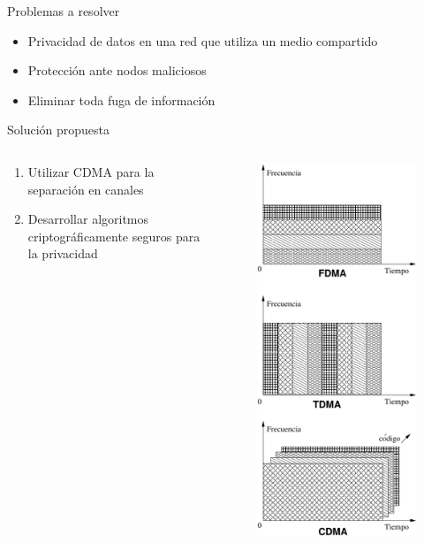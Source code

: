 \documentclass[aspectratio=169]{beamer}
\begin{document}
\begin{frame}{Problemas a resolver}

\begin{itemize}
 \item Privacidad de datos en una red que utiliza un medio compartido
 \item Protección ante nodos maliciosos
 \item Eliminar toda fuga de información
 \end{itemize}
\end{frame}

\begin{frame}{Solución propuesta}
\begin{columns}
  \begin{column}{0.60\textwidth}

\begin{enumerate}
 \item Utilizar CDMA para la separación en canales
 \item Desarrollar algoritmos criptográficamente seguros para la privacidad
 \end{enumerate}

  \end{column}
  \begin{column}{0.40\textwidth}

 
\begin{figure}[t]
  \centering
  \includegraphics[width=0.55 \textwidth]{../graphs/tdmacdma} 
  \label{fig_tdmacdma}
\end{figure}


\end{column}
\end{columns}
\end{frame}
\end{document}

